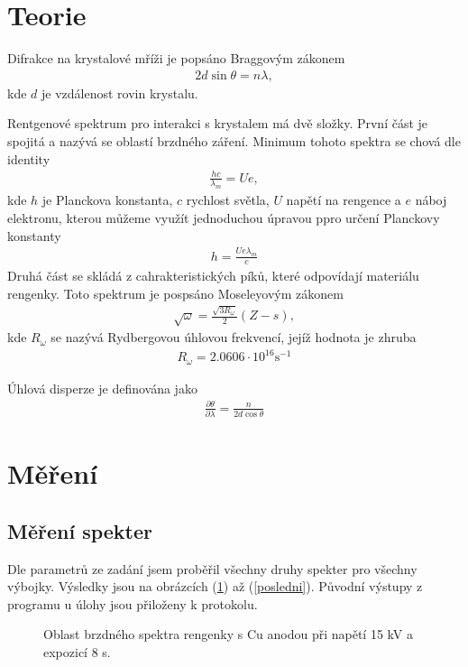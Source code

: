 \documentclass[a4paper,12pt]{article}
\begin{document}
\section{Teorie}
Difrakce na krystalové mříži je popsáno Braggovým zákonem
\begin{eqnarray}
2d\sin{\theta}=n\lambda ,
\label{bragg}
\end{eqnarray}
kde $d$ je vzdálenost rovin krystalu.

Rentgenové spektrum pro interakci s krystalem má dvě složky. První část je spojitá a nazývá se oblastí brzdného záření. Minimum tohoto spektra se chová dle identity
\begin{eqnarray}
\frac{hc}{\lambda_m}=Ue,
\end{eqnarray}
kde $h$ je Planckova konstanta, $c$ rychlost světla, $U$ napětí na rengence a $e$ náboj elektronu, kterou můžeme využít jednoduchou úpravou ppro určení Planckovy konstanty
\begin{eqnarray}
h=\frac{Ue\lambda_m}{c}
\label{planc}
\end{eqnarray}
Druhá část se skládá z cahrakteristických píků, které odpovídají materiálu rengenky. Toto spektrum je pospsáno Moseleyovým zákonem
\begin{eqnarray}
\sqrt{\omega}=\frac{\sqrt{3R_\omega}}{2}\left(Z-s\right),
\end{eqnarray}
kde $R_\omega$ se nazývá Rydbergovou úhlovou frekvencí, jejíž hodnota je zhruba
\begin{eqnarray}
R_\omega=2.0606\cdot10^{16} \mbox{s}^{-1}
\end{eqnarray}

Úhlová disperze je definována jako
\begin{eqnarray}
\frac{\partial\theta}{\partial\lambda}=\frac{n}{2d\cos{\theta}}
\label{disp}
\end{eqnarray}

\section{Měření}
\subsection{Měření spekter}
Dle parametrů ze zadání jsem proběřil všechny druhy spekter pro všechny výbojky. Výsledky jsou na obrázcích (\ref{prvni}) až (\ref{posledni}). Původní výstupy z programu u úlohy 
jsou přiloženy k protokolu. 

\begin{figure}
\begin{center}

\end{center}
\caption{Oblast brzdného spektra rengenky s Cu anodou při napětí 15 kV a expozicí 8 s.}
\label{prvni}
\end{figure}
\end{document}
